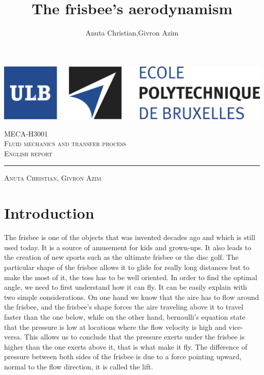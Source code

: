 \documentclass[10pt,a4paper]{report}
\author{Anuta Christian,Givron Azim}
\title{The frisbee's aerodynamism}
\begin{document}
\begin{titlepage}

\includegraphics[scale=0.5]{logo-polytech-ULB-FR.jpg}

\center 
\vspace{5cm}
\textsc{\large MECA-H3001} \\[0.5cm]
\textsc{\LARGE Fluid mechanics and transfer process} \\[1.5cm]
\textsc{\Large English report} %

\rule{\textwidth}{1pt}

\vspace{2cm}

\textsc{\large Anuta Christian, Givron Azim}

\end{titlepage}



\tableofcontents
\newpage 
\section{Introduction}
The frisbee is one of the objects that was invented decades ago and which is still used today. It is a source of amusement for kids and grown-ups. It also leads to the creation of new sports such as the ultimate frisbee or the disc golf. The particular shape of the frisbee allows it to glide for really long distances but to make the most of it, the toss has to be well oriented. In order to find the optimal angle, we need to first understand how it can fly. It can be easily explain with two simple considerations. On one hand we know that the aire has to flow around the frisbee, and the frisbee's shape forces the aire traveling above it to travel faster than the one below, while on the other hand, bernoulli's equation state that the pressure is low at locations where the flow velocity is high and vice-versa. This allows us to conclude that the pressure exerts under the frisbee is higher than the one exerts above it, that is what make it fly. The difference of pressure between both sides of the frisbee is due to a force pointing upward, normal to the flow direction, it is called the lift. 
\end{document}

